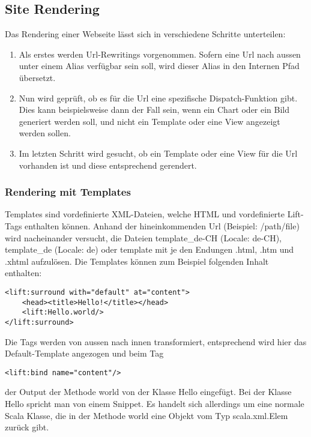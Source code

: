 \subsection{Site Rendering \cite[p. 27-43]{chen2009lift}}
Das Rendering einer Webseite l\"asst sich in verschiedene Schritte unterteilen:

\begin{enumerate}
	\item Als erstes werden Url-Rewritings vorgenommen. Sofern eine Url nach aussen unter einem Alias verf\"ugbar sein soll, wird dieser Alias in den Internen Pfad \"ubersetzt.
	\item Nun wird gepr\"uft, ob es f\"ur die Url eine spezifische Dispatch-Funktion gibt. Dies kann beispielsweise dann der Fall sein, wenn ein Chart oder ein Bild generiert werden soll, und nicht ein Template oder eine View angezeigt werden sollen. 
	\item Im letzten Schritt wird gesucht, ob ein Template oder eine View f\"ur die Url vorhanden ist und diese entsprechend gerendert.
\end{enumerate}

\subsubsection{Rendering mit Templates} \label{grundlagen:templates}
Templates sind vordefinierte XML-Dateien, welche HTML und vordefinierte Lift-Tags enthalten k\"onnen. Anhand der hineinkommenden Url (Beispiel: /path/file) wird nacheinander versucht, die Dateien template\_de-CH (Locale: de-CH), template\_de (Locale: de) oder template mit je den Endungen .html, .htm und .xhtml aufzul\"osen. Die Templates k\"onnen zum Beispiel folgenden Inhalt enthalten:

\begin{lstlisting}[caption=Lift Template Surround]
<lift:surround with="default" at="content">
	<head><title>Hello!</title></head>
	<lift:Hello.world/>
</lift:surround>
\end{lstlisting}

Die Tags werden von aussen nach innen transformiert, entsprechend wird hier das Default-Template angezogen und beim Tag 
\begin{lstlisting}[caption=Lift Template Binding]
<lift:bind name="content"/>
\end{lstlisting}
der Output der Methode world von der Klasse Hello eingef\"ugt. Bei der Klasse Hello spricht man von einem Snippet. Es handelt sich allerdings um eine normale Scala Klasse, die in der Methode world eine Objekt vom Typ scala.xml.Elem zur\"uck gibt.

